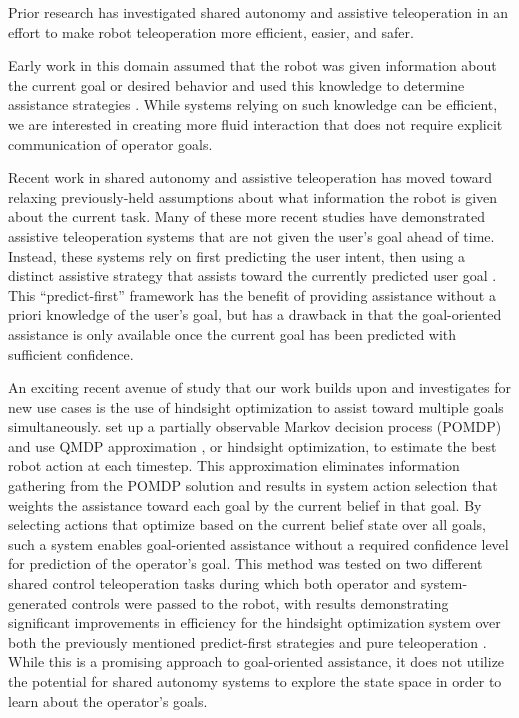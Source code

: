 \documentclass[conference]{IEEEtran}
\begin{document}
Prior research has investigated shared autonomy and assistive teleoperation in an effort to make robot teleoperation more efficient, easier, and safer.

Early work in this domain assumed that the robot was given information about the current goal or desired behavior and used this knowledge to determine assistance strategies \cite{aigner1997human, debus2001cooperative, goodrich2001experiments}. While systems relying on such knowledge can be efficient, we are interested in creating more fluid interaction that does not require explicit communication of operator goals.

Recent work in shared autonomy and assistive teleoperation has moved toward relaxing previously-held assumptions about what information the robot is given about the current task. Many of these more recent studies have demonstrated assistive teleoperation systems that are not given the user's goal ahead of time. Instead, these systems rely on first predicting the user intent, then using a distinct assistive strategy that assists toward the currently predicted user goal \cite{dragan2012formalizing, fagg2004extracting, kragic2005human, schultz2017goal, yu2005telemanipulation}. This ``predict-first'' framework has the benefit of providing assistance without a priori knowledge of the user's goal, but has a drawback in that the goal-oriented assistance is only available once the current goal has been predicted with sufficient confidence.

An exciting recent avenue of study that our work builds upon and investigates for new use cases is the use of hindsight optimization to assist toward multiple goals simultaneously. \citet{javdani2015shared} set up a partially observable Markov decision process (POMDP) and use QMDP approximation \cite{littman1995learning}, or hindsight optimization, to estimate the best robot action at each timestep. This approximation eliminates information gathering from the POMDP solution and results in system action selection that weights the assistance toward each goal by the current belief in that goal. By selecting actions that optimize based on the current belief state over all goals, such a system enables goal-oriented assistance without a required confidence level for prediction of the operator's goal. This method was tested on two different shared control teleoperation tasks during which both operator and system-generated controls were passed to the robot, with results demonstrating significant improvements in efficiency for the hindsight optimization system over both the previously mentioned predict-first strategies and pure teleoperation \cite{javdani2018shared}. While this is a promising approach to goal-oriented assistance, it does not utilize the potential for shared autonomy systems to explore the state space in order to learn about the operator's goals.
\end{document}
